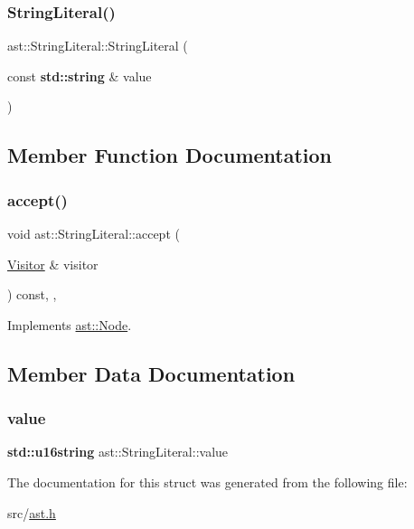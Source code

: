 \mbox{\label{structast_1_1_string_literal_aebc9195c9b488b10378322fcd2fd69e4}} 
\subsubsection{\texorpdfstring{String\+Literal()}{StringLiteral()}\hspace{0.1cm}{\footnotesize\ttfamily [2/2]}}
{\footnotesize\ttfamily ast\+::\+String\+Literal\+::\+String\+Literal (\begin{DoxyParamCaption}\item[{const \textbf{ std\+::string} \&}]{value }\end{DoxyParamCaption})\hspace{0.3cm}{\ttfamily [inline]}}



\subsection{Member Function Documentation}
\mbox{\label{structast_1_1_string_literal_abf4cae9ed97b2f9b9cf92f2a06f1ec74}} 
\subsubsection{\texorpdfstring{accept()}{accept()}}
{\footnotesize\ttfamily void ast\+::\+String\+Literal\+::accept (\begin{DoxyParamCaption}\item[{\hyperlink{structast_1_1_visitor}{Visitor} \&}]{visitor }\end{DoxyParamCaption}) const\hspace{0.3cm}{\ttfamily [inline]}, {\ttfamily [override]}, {\ttfamily [virtual]}}



Implements \hyperlink{structast_1_1_node_abc089ee6caaf06a4445ebdd8391fdebc}{ast\+::\+Node}.



\subsection{Member Data Documentation}
\mbox{\label{structast_1_1_string_literal_ae29e252908fc00142e9b79371795a2e5}} 
\subsubsection{\texorpdfstring{value}{value}}
{\footnotesize\ttfamily \textbf{ std\+::u16string} ast\+::\+String\+Literal\+::value}



The documentation for this struct was generated from the following file\+:\begin{DoxyCompactItemize}
\item 
src/\hyperlink{ast_8h}{ast.\+h}\end{DoxyCompactItemize}
